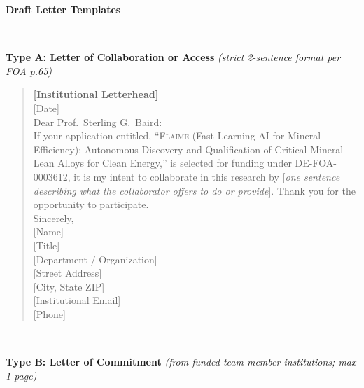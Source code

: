\documentclass[11pt,letterpaper]{article}
\newcommand{\flaime}{\textsc{Flaime}}
\newcommand{\projecttitle}{\flaime{} (Fast Learning AI for Mineral
Efficiency): Autonomous Discovery and Qualification of
Critical-Mineral-Lean Alloys for Clean Energy}
\begin{document}
\bigskip
\noindent\textbf{\large Draft Letter Templates}

\medskip
\noindent\rule{\textwidth}{0.4pt}\\
\textbf{Type A: Letter of Collaboration or Access} \textit{(strict 2-sentence format per FOA p.65)}
\smallskip

\begin{quote}\small
\textbf{{[}Institutional Letterhead{]}}\\[4pt]
{[}Date{]}\\[6pt]
Dear Prof.\ Sterling G.\ Baird:\\[4pt]
If your application entitled, ``\projecttitle{},'' is selected for
funding under DE-FOA-0003612, it is my intent to collaborate in this
research by {[}\emph{one sentence describing what the collaborator
offers to do or provide}{]}.
Thank you for the opportunity to participate.\\[12pt]
Sincerely,\\[4pt]
{[}Name{]}\\
{[}Title{]}\\
{[}Department / Organization{]}\\
{[}Street Address{]}\\
{[}City, State ZIP{]}\\
{[}Institutional Email{]}\\
{[}Phone{]}
\end{quote}

\medskip
\noindent\rule{\textwidth}{0.4pt}\\
\textbf{Type B: Letter of Commitment} \textit{(from funded team member institutions; max 1 page)}
\smallskip
\end{document}
